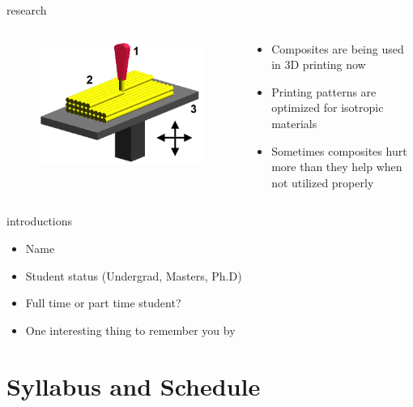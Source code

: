\documentclass[10pt]{beamer}
\begin{document}
\begin{frame}{research}
\begin{columns}
	\begin{column}{0.45\textwidth}
		\begin{figure}
		\centering
		\includegraphics[width=0.9\columnwidth]{3D-printing}
		\label{fig:3D-printing}
		\end{figure}
	\end{column}
	\begin{column}{0.45\textwidth}
		\begin{itemize}
			\item Composites are being used in 3D printing now
			\item Printing patterns are optimized for isotropic materials
			\item Sometimes composites hurt more than they help when not utilized properly
		\end{itemize}
	\end{column}
\end{columns}
\end{frame}

\begin{frame}{introductions}
\begin{itemize}
\item Name
\item Student status (Undergrad, Masters, Ph.D)
\item Full time or part time student?
\item One interesting thing to remember you by
\end{itemize}
\end{frame}

\section{Syllabus and Schedule}
\end{document}
